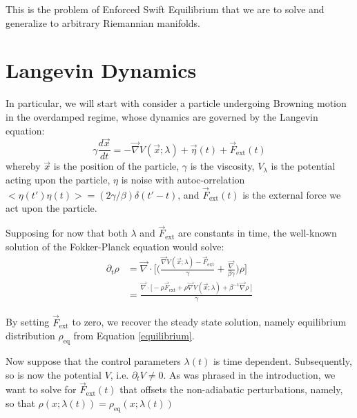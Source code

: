\documentclass[%
 reprint,
 amsmath,amssymb,
 aps,
]{revtex4-2}
\begin{document}
This is the problem of Enforced Swift Equilibrium that we are to solve and generalize to arbitrary Riemannian manifolds.

\section{Langevin Dynamics}

In particular, we will start with consider a particle undergoing Browning motion in the overdamped regime, whose dynamics are governed by the Langevin equation:
%
\begin{equation}
    \gamma \frac{d\vec{x}}{dt} = - \vec{\nabla} V(\vec{x}; \lambda) %
    + \vec{\eta}(t) + \vec{F}_{\mathrm{ext}}(t)
\end{equation} %
\noindent
whereby $\vec{x}$ is the position of the particle, $\gamma$ is the viscosity, $V_\lambda$ is the potential acting upon the particle, $\eta$ is noise with autoc-orrelation $< \eta(t') \eta(t) > = (2\gamma/\beta) \delta(t' - t)$, and $\vec{F}_{\mathrm{ext}}(t)$ is the external force we act upon the particle.

Supposing for now that both $\lambda$ and $ \vec{F}_{\mathrm{ext}}$ are constants in time, the well-known solution of the Fokker-Planck equation would solve:
\begin{align} \label{FP}
    \partial_t \rho &= \vec{\nabla} \cdot \bigg[ \bigg(\frac{\vec{\nabla} V(\vec{x}; \lambda) - \vec{F}_\mathrm{ext}}{\gamma} + \frac{\vec{\nabla} }{\beta \gamma} \bigg) \rho \bigg] \\
    &= \frac{ \vec{\nabla} \cdot \big[ - \rho \vec{F}_\mathrm{ext} +  \rho \vec{\nabla} V(\vec{x}; \lambda) + \beta^{-1} \vec{\nabla}\rho \ \big] }{ \gamma }
\end{align} %

By setting $\vec{F}_\mathrm{ext}$ to zero, we recover the steady state solution, namely equilibrium distribution $\rho_\mathrm{eq}$ from Equation \ref{equilibrium}.

Now suppose that the control parameters $\lambda(t)$ is time dependent. Subsequently, so is now the potential $V$, i.e. $\partial_t V \neq 0$. As was phrased in the introduction, we want to solve for $\vec{F}_\mathrm{ext}(t)$ that offsets the non-adiabatic perturbations, namely, so that $\rho(x; \lambda(t)) = \rho_\mathrm{eq}(x; \lambda(t))$
\end{document}
